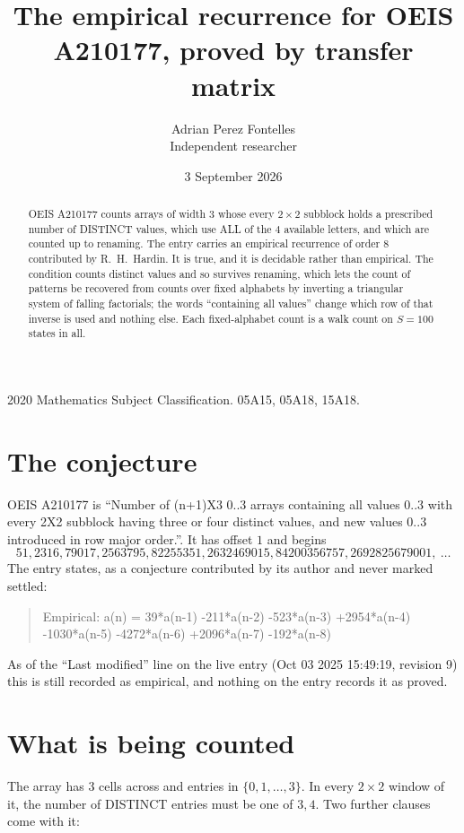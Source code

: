 \documentclass[11pt,a4paper]{article}
\title{The empirical recurrence for OEIS A210177, proved by transfer matrix}
\author{Adrian Perez Fontelles\\ \small Independent researcher}
\date{3 September 2026}
\theoremstyle{plain}
\theoremstyle{definition}
\begin{document}
\maketitle

\begin{abstract}
OEIS A210177 counts arrays of width $3$ whose every $2\times2$ subblock holds a
prescribed number of DISTINCT values, which use ALL of the $4$ available letters, and which
are counted up to renaming. The entry carries an empirical recurrence of order $8$
contributed by R.~H.~Hardin. It is true, and it is decidable rather than empirical. The
condition counts distinct values and so survives renaming, which lets the count of patterns be
recovered from counts over fixed alphabets by inverting a triangular system of falling
factorials; the words ``containing all values'' change which row of that inverse is used and
nothing else. Each fixed-alphabet count is a walk count on $S=100$ states in all.
\end{abstract}

\noindent\small 2020 Mathematics Subject Classification. 05A15, 05A18, 15A18.\normalsize

\section{The conjecture}

OEIS A210177 is ``Number of (n+1)X3 0..3 arrays containing all values 0..3 with every 2X2 subblock having three or four distinct values, and new values 0..3 introduced in row major order.''. It has offset $1$ and begins
\[
51, 2316, 79017, 2563795, 82255351, 2632469015, 84200356757, 2692825679001,\ \dots
\]
The entry states, as a conjecture contributed by its author and never marked settled:
\begin{quote}
Empirical: a(n) = 39*a(n-1) -211*a(n-2) -523*a(n-3) +2954*a(n-4) -1030*a(n-5) -4272*a(n-6) +2096*a(n-7) -192*a(n-8)
\end{quote}
As of the ``Last modified'' line on the live entry (Oct 03 2025 15:49:19, revision 9) this is still
recorded as empirical, and nothing on the entry records it as proved.

\section{What is being counted}

The array has $3$ cells across and entries in $\{0,1,\dots,3\}$. In every
$2\times2$ window of it, the number of DISTINCT entries must be one of $3, 4$. Two
further clauses come with it:
\end{document}
